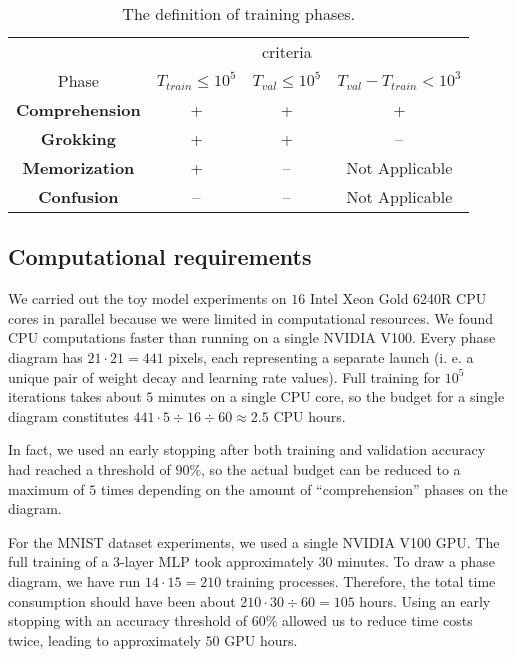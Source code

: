 \begin{table}[]
    \centering
    \renewcommand{\arraystretch}{1.2}
    \begin{tabular}{ cccc } 
     \hline
     {} & {} & criteria & {} \\
     \cline{2-4}
     Phase & $T_{train} \le 10^5$ & $T_{val} \le 10^5$ & $T_{val} - T_{train} < 10^3$ \\ 
     \hline
     \textbf{Comprehension} & + & + & +\\ 
     \textbf{Grokking} & + & + & --\\ 
     \textbf{Memorization} & + & -- & Not Applicable \\ 
     \textbf{Confusion} & -- & -- & Not Applicable \\ 
     \hline
    \end{tabular}
    \caption{The definition of training phases.}
    \label{tab:1}
\end{table}

\subsection{Computational requirements}

We carried out the toy model experiments on $16$ Intel Xeon Gold 6240R CPU cores in parallel because we were limited in computational resources. We found CPU computations faster than running on a single NVIDIA V100. Every phase diagram has $21 \cdot 21 = 441$ pixels, each representing a separate launch (i. e. a unique pair of weight decay and learning rate values). Full training for $10^5$ iterations takes about $5$ minutes on a single CPU core, so the budget for a single diagram constitutes $441 \cdot 5 \div 16 \div 60 \approx 2.5$ CPU hours.

In fact, we used an early stopping after both training and validation accuracy had reached a threshold of $90\%$, so the actual budget can be reduced to a maximum of $5$ times depending on the amount of ``comprehension'' phases on the diagram.

For the MNIST dataset experiments, we used a single NVIDIA V100 GPU. The full training of a $3$-layer MLP took approximately $30$ minutes. To draw a phase diagram, we have run $14 \cdot 15 = 210$ training processes. Therefore, the total time consumption should have been about $210 \cdot 30 \div 60 = 105$ hours. Using an early stopping with an accuracy threshold of $60\%$ allowed us to reduce time costs twice, leading to approximately $50$ GPU hours.


